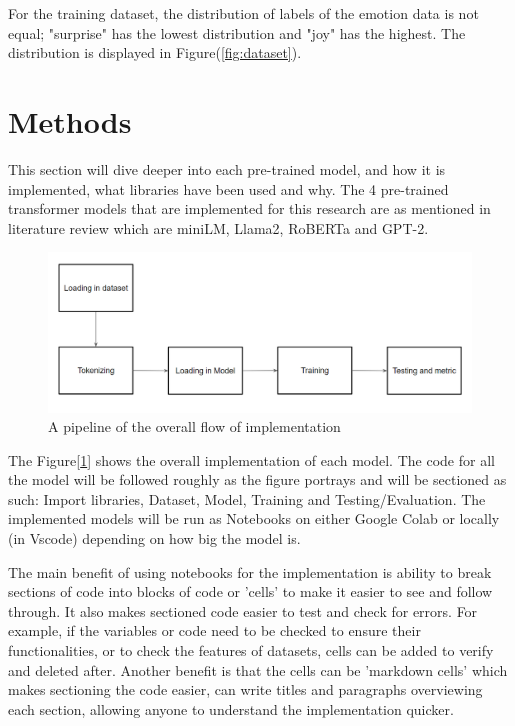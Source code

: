 For the training dataset, the distribution of labels of the emotion data is not equal; "surprise" has the lowest distribution and "joy" has the highest. The distribution is displayed in Figure(\ref{fig:dataset}).



\section{Methods}

This section will dive deeper into each pre-trained model, and how it is implemented, what libraries have been used and why. The 4 pre-trained transformer models that are implemented for this research are as mentioned in literature review which are miniLM, Llama2, RoBERTa and GPT-2.

\begin{figure}[ht]
    \centerline{\includegraphics[scale=0.45]{Figures/problem_pipeline.png}}
    \caption{A pipeline of the overall flow of implementation}
    \label{fig:pipeline}
\end{figure}

The Figure[\ref{fig:pipeline}] shows the overall implementation of each model. The code for all the model will be followed roughly as the figure portrays and will be sectioned as such: Import libraries, Dataset, Model, Training and Testing/Evaluation. The implemented models will be run as Notebooks on either Google Colab or locally (in Vscode) depending on how big the model is.

The main benefit of using notebooks for the implementation is ability to break sections of code into blocks of code or 'cells' to make it easier to see and follow through. It also makes sectioned code easier to test and check for errors. For example, if the variables or code need to be checked to ensure their functionalities, or to check the features of datasets, cells can be added to verify and deleted after. Another benefit is that the cells can be 'markdown cells' which makes sectioning the code easier, can write titles and paragraphs overviewing each section, allowing anyone to understand the implementation quicker.

